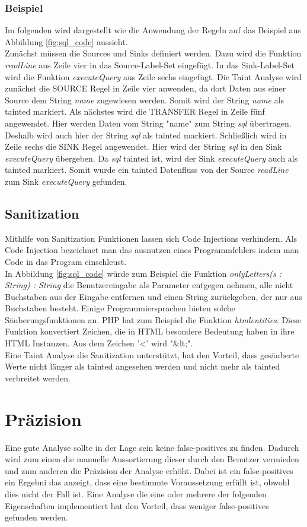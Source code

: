 \documentclass[runningheads]{llncs}
\begin{document}
\subsubsection{Beispiel}
Im folgenden wird dargestellt wie die Anwendung der Regeln auf das Beispiel aus Abbildung \ref{fig:sql_code} aussieht. 
\\Zunächst müssen die Sources und Sinks definiert werden. Dazu wird die Funktion \emph{readLine} aus Zeile vier in das Source-Label-Set eingefügt. In das Sink-Label-Set wird die Funktion \emph{executeQuery} aus Zeile sechs eingefügt. Die Taint Analyse wird zunächst die SOURCE Regel in Zeile vier anwenden, da dort Daten aus einer Source dem String \emph{name} zugewiesen werden. Somit wird der String \emph{name} als tainted markiert. Als nächstes wird die TRANSFER Regel in Zeile fünf angewendet. Hier werden Daten vom String "name" zum String \emph{sql} übertragen. Deshalb wird auch hier der String \emph{sql} als tainted markiert. Schließlich wird in Zeile sechs die SINK Regel angewendet. Hier wird der String \emph{sql} in den Sink \emph{executeQuery} übergeben. Da \emph{sql} tainted ist, wird der Sink \emph{executeQuery} auch als tainted markiert. Somit wurde ein tainted Datenfluss von der Source \emph{readLine} zum Sink \emph{executeQuery} gefunden.

\subsection{Sanitization}
Mithilfe von Sanitization Funktionen lassen sich Code Injections verhindern. Als Code Injection bezeichnet man das ausnutzen eines Programmfehlers indem man Code in das Program einschleust.
\\In Abbildung \ref{fig:sql_code} würde zum Beispiel die Funktion \emph{onlyLetters(s : String) : String} die Benutzereingabe als Parameter entgegen nehmen, alle nicht Buchstaben aus der Eingabe entfernen und einen String zurückgeben, der nur aus Buchstaben besteht. Einige Programmiersprachen bieten solche Säuberungsfunktionen an. PHP hat zum Beispiel die Funktion \emph{htmlentities}. Diese Funktion konvertiert Zeichen, die in HTML besondere Bedeutung haben in ihre HTML Instanzen. Aus dem Zeichen '\textless' wird "\&lt;".\\
Eine Taint Analyse die Sanitization unterstützt, hat den Vorteil, dass gesäuberte Werte nicht länger als tainted angesehen werden und nicht mehr als tainted verbreitet werden.

\section{Präzision}\label{sec:precision}
Eine gute Analyse sollte in der Lage sein keine false-positives zu finden. Dadurch wird zum einen die manuelle Aussortierung dieser durch den Benutzer vermieden und zum anderen die Präzision der Analyse erhöht. Dabei ist ein false-positives ein Ergebni das anzeigt, dass eine bestimmte Voraussetzung erfüllt ist, obwohl dies nicht der Fall ist. Eine Analyse die eine oder mehrere der folgenden Eigenschaften implementiert hat den Vorteil, dass weniger false-positives gefunden werden.
\end{document}
